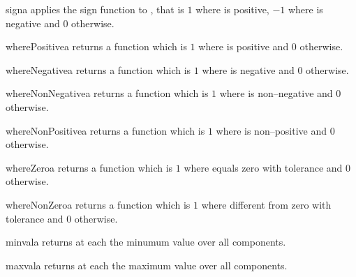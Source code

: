 \begin{funcdesc}{sign}{a}
applies the sign function to , that is $1$ where  is positive,
$-1$ where  is negative and $0$ otherwise.
\end{funcdesc}

\begin{funcdesc}{wherePositive}{a}
returns a function which is $1$ where  is positive and $0$ otherwise.
\end{funcdesc}

\begin{funcdesc}{whereNegative}{a}
returns a function which is $1$ where  is negative and $0$ otherwise.
\end{funcdesc}

\begin{funcdesc}{whereNonNegative}{a}
returns a function which is $1$ where  is non--negative and $0$ otherwise.
\end{funcdesc}

\begin{funcdesc}{whereNonPositive}{a}
returns a function which is $1$ where  is non--positive and $0$ otherwise.
\end{funcdesc}

\begin{funcdesc}{whereZero}{a}
returns a function which is $1$ where  equals zero with tolerance  and $0$ otherwise. 
\end{funcdesc}

\begin{funcdesc}{whereNonZero}{a}
returns a function which is $1$ where  different from zero with tolerance  and $0$ otherwise. 
\end{funcdesc}

\begin{funcdesc}{minval}{a}
returns at each \DataSamplePoints the minumum value over all components.
\end{funcdesc}

\begin{funcdesc}{maxval}{a}
returns at each \DataSamplePoints the maximum value over all components.
\end{funcdesc}

